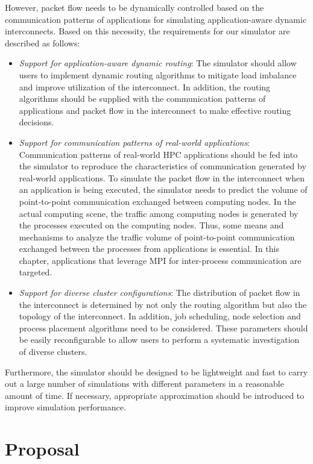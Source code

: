 However, packet flow needs to be dynamically controlled based on the
communication patterns of applications for simulating application-aware
dynamic interconnects. Based on this necessity, the requirements for our
simulator are described as follows:

\begin{itemize}
\item
  \emph{Support for application-aware dynamic routing}: The simulator
  should allow users to implement dynamic routing algorithms to mitigate
  load imbalance and improve utilization of the interconnect. In
  addition, the routing algorithms should be supplied with the
  communication patterns of applications and packet flow in the
  interconnect to make effective routing decisions.
\item
  \emph{Support for communication patterns of real-world applications}:
  Communication patterns of real-world HPC applications should be fed
  into the simulator to reproduce the characteristics of communication
  generated by real-world applications. To simulate the packet flow in
  the interconnect when an application is being executed, the simulator
  needs to predict the volume of point-to-point communication exchanged
  between computing nodes. In the actual computing scene, the traffic
  among computing nodes is generated by the processes executed on the
  computing nodes. Thus, some means and mechanisms to analyze the
  traffic volume of point-to-point communication exchanged between the
  processes from applications is essential. In this chapter, applications
  that leverage MPI for inter-process communication are targeted.
\item
  \emph{Support for diverse cluster configurations}: The distribution of
  packet flow in the interconnect is determined by not only the routing
  algorithm but also the topology of the interconnect. In addition, job
  scheduling, node selection and process placement algorithms need to be
  considered. These parameters should be easily reconfigurable to allow
  users to perform a systematic investigation of diverse clusters.
\end{itemize}

Furthermore, the simulator should be designed to be lightweight and fast
to carry out a large number of simulations with different parameters in
a reasonable amount of time. If necessary, appropriate approximation
should be introduced to improve simulation performance.

\section{Proposal}\label{sec:ii-proposal}

